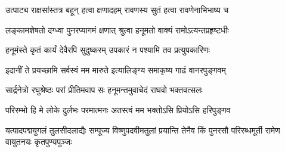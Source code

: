 \twolineshloka
{उत्पाट्य राक्षसांस्तत्र बहून् हत्वा क्षणादहम्}
{रावणस्य सुतं हत्वा रावणेनाभिभाष्य च} %

\twolineshloka
{लङ्कामशेषतो दग्ध्वा पुनरप्यागमं क्षणात्}
{श्रुत्वा हनूमतो वाक्यं रामोऽत्यन्तप्रहृष्टधीः} %

\twolineshloka
{हनूमंस्ते कृतं कार्यं देवैरपि सुदुष्करम्}
{उपकारं न पश्यामि तव प्रत्युपकारिणः} %

\twolineshloka
{इदानीं ते प्रयच्छामि सर्वस्वं मम मारुते}
{इत्यालिङ्ग्य समाकृष्य गाढं वानरपुङ्गवम्} %

\twolineshloka
{सार्द्रनेत्रो रघुश्रेष्ठः परां प्रीतिमवाप सः}
{हनूमन्तमुवाचेदं राघवो भक्तवत्सलः} %

\twolineshloka
{परिरम्भो हि मे लोके दुर्लभः परमात्मनः}
{अतस्त्वं मम भक्तोऽसि प्रियोऽसि हरिपुङ्गव} %

\fourlineindentedshloka
{यत्पादपद्मयुगलं तुलसीदलाद्यैः}
{सम्पूज्य विष्णुपदवीमतुलां प्रयान्ति}
{तेनैव किं पुनरसौ परिरब्धमूर्ती}
{रामेण वायुतनयः कृतपुण्यपुञ्जः} %


